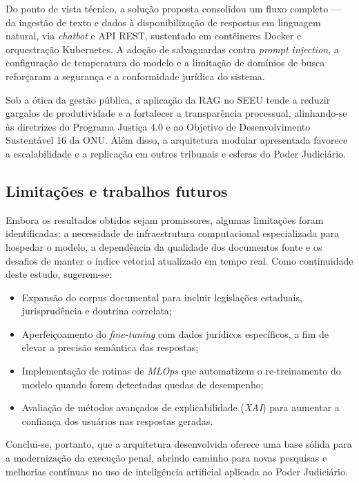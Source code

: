Do ponto de vista técnico, a solução proposta consolidou um fluxo completo — da ingestão de texto e dados à disponibilização de respostas em linguagem natural, via \textit{chatbot} e API REST, sustentado em contêineres Docker e orquestração Kubernetes. A adoção de salvaguardas contra \textit{prompt injection}, a configuração de temperatura do modelo e a limitação de domínios de busca reforçaram a segurança e a conformidade jurídica do sistema.

Sob a ótica da gestão pública, a aplicação da RAG no SEEU tende a reduzir gargalos de produtividade e a fortalecer a transparência processual, alinhando-se às diretrizes do Programa Justiça 4.0 e ao Objetivo de Desenvolvimento Sustentável 16 da ONU. Além disso, a arquitetura modular apresentada favorece a escalabilidade e a replicação em outros tribunais e esferas do Poder Judiciário.

\subsection*{Limitações e trabalhos futuros}

Embora os resultados obtidos sejam promissores, algumas limitações foram identificadas: a necessidade de infraestrutura computacional especializada para hospedar o modelo, a dependência da qualidade dos documentos fonte e os desafios de manter o índice vetorial atualizado em tempo real. Como continuidade deste estudo, sugerem-se:

\begin{itemize}
  \item Expansão do corpus documental para incluir legislações estaduais, jurisprudência e doutrina correlata;
  \item Aperfeiçoamento do \textit{fine-tuning} com dados jurídicos específicos, a fim de elevar a precisão semântica das respostas;
  \item Implementação de rotinas de \textit{MLOps} que automatizem o re-treinamento do modelo quando forem detectadas quedas de desempenho;
  \item Avaliação de métodos avançados de explicabilidade (\textit{XAI}) para aumentar a confiança dos usuários nas respostas geradas.
\end{itemize}

Conclui-se, portanto, que a arquitetura desenvolvida oferece uma base sólida para a modernização da execução penal, abrindo caminho para novas pesquisas e melhorias contínuas no uso de inteligência artificial aplicada ao Poder Judiciário.